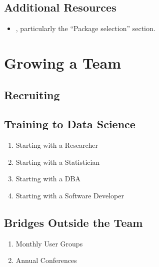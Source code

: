 \documentclass[
]{book}
\providecommand{\tightlist}{%
  \setlength{\itemsep}{0pt}\setlength{\parskip}{0pt}}
\begin{document}
\hypertarget{additional-resources-2}{%
\section{Additional Resources}\label{additional-resources-2}}

\begin{itemize}
\tightlist
\item
  \citep{gillespie}, particularly the ``Package selection'' section.
\end{itemize}

\hypertarget{team}{%
\chapter{Growing a Team}\label{team}}

\hypertarget{recruiting}{%
\section{Recruiting}\label{recruiting}}

\hypertarget{training-to-data-science}{%
\section{Training to Data Science}\label{training-to-data-science}}

\begin{enumerate}
\def\labelenumi{\arabic{enumi}.}
\tightlist
\item
  Starting with a Researcher
\item
  Starting with a Statistician
\item
  Starting with a DBA
\item
  Starting with a Software Developer
\end{enumerate}

\hypertarget{bridges-outside-the-team}{%
\section{Bridges Outside the Team}\label{bridges-outside-the-team}}

\begin{enumerate}
\def\labelenumi{\arabic{enumi}.}
\tightlist
\item
  Monthly User Groups
\item
  Annual Conferences
\end{enumerate}

\cleardoublepage
\end{document}
